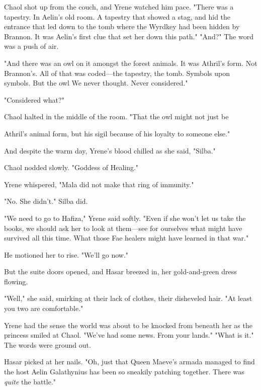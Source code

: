 Chaol shot up from the couch, and Yrene watched him pace. "There was a tapestry. In Aelin's old room. A tapestry that showed a stag, and hid the entrance that led down to the tomb where the Wyrdkey had been hidden by Brannon. It was Aelin's first clue that set her down this path." "And?" The word was a push of air.

"And there was an owl on it amongst the forest animals. It was Athril's form. Not Brannon's. All of that was coded---the tapestry, the tomb. Symbols upon symbols. But the owl  We never thought. Never considered."

"Considered what?"

Chaol halted in the middle of the room. "That the owl might not just be

Athril's animal form, but his sigil because of his loyalty to someone else."

And despite the warm day, Yrene's blood chilled as she said, "Silba."

Chaol nodded slowly. "Goddess of Healing."

Yrene whispered, "Mala did not make that ring of immunity."

"No. She didn't." Silba did.

"We need to go to Hafiza," Yrene said softly. "Even if she won't let us take the books, we should ask her to look at them---see for ourselves what might have survived all this time. What those Fae healers might have learned in that war."

He motioned her to rise. "We'll go now."

But the suite doors opened, and Hasar breezed in, her gold-and-green dress flowing.

"Well," she said, smirking at their lack of clothes, their disheveled hair. "At least you two are comfortable."

Yrene had the sense the world was about to be knocked from beneath her as the princess smiled at Chaol. "We've had some news. From your lands." "What is it." The words were ground out.

Hasar picked at her nails. "Oh, just that Queen Maeve's armada managed to find the host Aelin Galathynius has been so sneakily patching together. There was \emph{quite} the battle."


